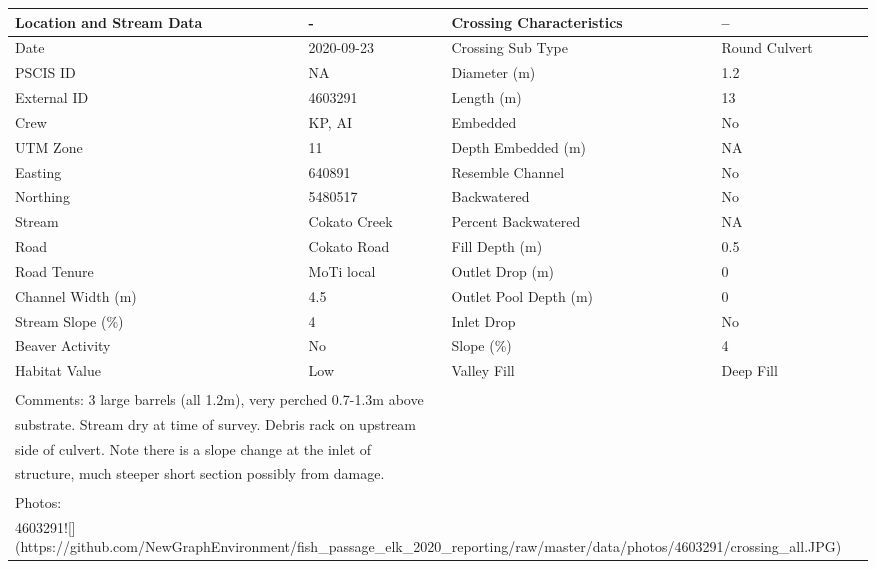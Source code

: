 \documentclass[
]{book}
\begin{document}
\begin{tabular}{l|l|l|l}
\hline
Location and Stream Data & - & Crossing Characteristics & --\\
\hline
Date & 2020-09-23 & Crossing Sub Type & Round Culvert\\
\hline
PSCIS ID & NA & Diameter (m) & 1.2\\
\hline
External ID & 4603291 & Length (m) & 13\\
\hline
Crew & KP, AI & Embedded & No\\
\hline
UTM Zone & 11 & Depth Embedded (m) & NA\\
\hline
Easting & 640891 & Resemble Channel & No\\
\hline
Northing & 5480517 & Backwatered & No\\
\hline
Stream & Cokato Creek & Percent Backwatered & NA\\
\hline
Road & Cokato Road & Fill Depth (m) & 0.5\\
\hline
Road Tenure & MoTi local & Outlet Drop (m) & 0\\
\hline
Channel Width (m) & 4.5 & Outlet Pool Depth (m) & 0\\
\hline
Stream Slope (\%) & 4 & Inlet Drop & No\\
\hline
Beaver Activity & No & Slope (\%) & 4\\
\hline
Habitat Value & Low & Valley Fill & Deep Fill\\
\hline
\multicolumn{4}{l}{\textsuperscript{} Comments: 3 large barrels (all 1.2m), very perched 0.7-1.3m above}\\
\multicolumn{4}{l}{substrate. Stream dry at time of survey. Debris rack on upstream}\\
\multicolumn{4}{l}{side of culvert. Note there is a slope change at the inlet of}\\
\multicolumn{4}{l}{structure, much steeper short section possibly from damage.}\\
\multicolumn{4}{l}{\textsuperscript{} Photos:}\\
\multicolumn{4}{l}{4603291![](https://github.com/NewGraphEnvironment/fish\_passage\_elk\_2020\_reporting/raw/master/data/photos/4603291/crossing\_all.JPG)}\\
\end{tabular}
\end{document}

